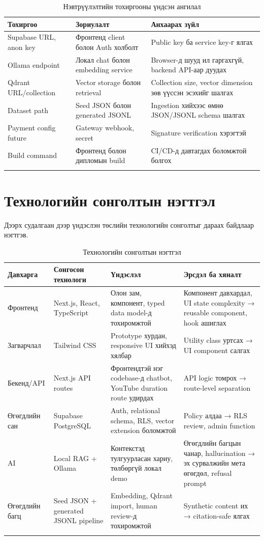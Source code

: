 \begin{longtable}{|p{}|p{}|p{}|}
  \hline
  \textbf{Тохиргоо} & \textbf{Зориулалт} & \textbf{Анхаарах зүйл} \\ \hline
  Supabase URL, anon key & Фронтенд client болон Auth холболт & Public key ба service key-г ялгах \\ \hline
  Ollama endpoint & Локал chat болон embedding service & Browser-д шууд ил гаргахгүй, backend API-аар дуудах \\ \hline
  Qdrant URL/collection & Vector storage болон retrieval & Collection size, vector dimension зөв үүссэн эсэхийг шалгах \\ \hline
  Dataset path & Seed JSON болон generated JSONL & Ingestion хийхээс өмнө JSON/JSONL schema шалгах \\ \hline
  Payment config future & Gateway webhook, secret & Signature verification хэрэгтэй \\ \hline
  Build command & Фронтенд болон дипломын build & CI/CD-д давтагдах боломжтой болгох \\ \hline
  \caption{Нэвтрүүлэлтийн тохиргооны үндсэн ангилал}
  \label{tab:deployment-config-tech}
\end{longtable}

\section{Технологийн сонголтын нэгтгэл}
Дээрх судалгаан дээр үндэслэн төслийн технологийн сонголтыг дараах байдлаар нэгтгэв.

\begin{longtable}{|p{}|p{}|p{}|p{}|}
  \hline
  \textbf{Давхарга} & \textbf{Сонгосон технологи} & \textbf{Үндэслэл} & \textbf{Эрсдэл ба хяналт} \\ \hline
  Фронтенд & Next.js, React, TypeScript & Олон зам, компонент, typed data model-д тохиромжтой & Компонент давхардал, UI state complexity → reusable component, hook ашиглах \\ \hline
  Загварчлал & Tailwind CSS & Prototype хурдан, responsive UI хийхэд хялбар & Utility class уртсах → UI component салгах \\ \hline
  Бекенд/API & Next.js API routes & Фронтендтэй нэг codebase-д chatbot, YouTube duration route удирдах & API logic томрох → route-level separation \\ \hline
  Өгөгдлийн сан & Supabase PostgreSQL & Auth, relational schema, RLS, vector extension боломжтой & Policy алдаа → RLS review, admin function \\ \hline
  AI & Local RAG + Ollama & Контекстэд тулгуурласан хариу, төлбөргүй локал demo & Өгөгдлийн багцын чанар, hallucination → эх сурвалжийн мета өгөгдөл, refusal prompt \\ \hline
  Өгөгдлийн багц & Seed JSON + generated JSONL pipeline & Embedding, Qdrant import, human review-д тохиромжтой & Synthetic content их → citation-safe ялгах \\ \hline
  \caption{Технологийн сонголтын нэгтгэл}
  \label{tab:technology-summary}
\end{longtable}

